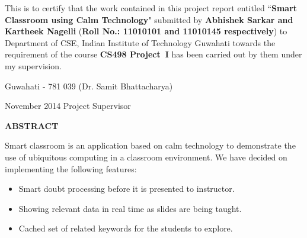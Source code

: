 \documentclass[12pt,a4paper]{report}
\theoremstyle{plain}
\theoremstyle{definition}
\theoremstyle{remark}
\begin{document}
\noindent
This is to certify that the work contained in this project report
entitled ``{\bf Smart Classroom using Calm Technology}" submitted
by {\bf Abhishek Sarkar and Kartheek Nagelli} ({\bf Roll No.: 11010101 and 11010145 respectively}) to Department of CSE, Indian Institute of Technology Guwahati
towards the requirement of the course \textbf{CS498 Project~I}
has been carried out by them under my
supervision.

\vspace{4cm}

\noindent Guwahati - 781 039 \hfill (Dr. Samit Bhattacharya)

\noindent November 2014 \hfill Project Supervisor

\clearpage

\begin{center}
{\Large{\bf{ABSTRACT}}}
\end{center}


Smart classroom is an application based on calm technology to demonstrate the use of ubiquitous computing in a classroom environment. We have decided on implementing the following features:
\begin{itemize}
  \item Smart doubt processing before it is presented to instructor.
  \item Showing relevant data in real time as slides are being taught.
  \item Cached set of related keywords for the students to explore.
\end{itemize}

\clearpage



\tableofcontents
\clearpage


\newpage

\setcounter{page}{1}





%



\nocite{Martinez-Maldonado:2013:IOU:2541016.2541076}



\end{document}
